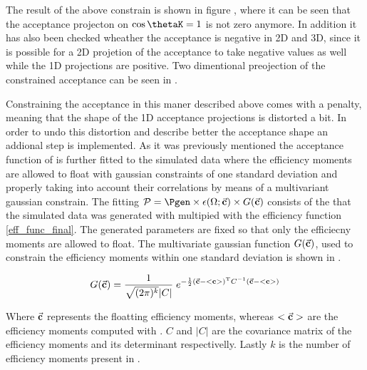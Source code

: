 \noindent The result of the above constrain is shown in figure , where it can be seen that the acceptance projecton on $\cos\thetaK=1$
is not zero anymore. In addition it has also been checked wheather the acceptance is negative in 2D and 3D, since it is possible for a 2D
projetion of the acceptance to take negative values as well while the 1D projections are positive. Two dimentional preojection of the constrained acceptance can be seen in .

Constraining the acceptance in this maner described above comes with a penalty, meaning that the shape of the 1D acceptance
projections is distorted a bit. In order to undo this distortion and describe better the acceptance shape an addional step is implemented. 
As it was previously mentioned the acceptance function of  is further fitted to the simulated data where the efficiency
moments are allowed to float with gaussian constraints of one standard deviation and properly taking into account their correlations by
means of a multivariant gaussian constrain. The fitting \pdf $\mathcal{P}= \Pgen \times\epsilon(\Omega;\vec{\bf c}) \times G(\vec{\bf{c}})$ 
consists of the \pdf that the simulated data was generated with multipied with the efficiency function \eqref{eff_func_final}. 
The generated parameters are fixed so that only the efficiecny moments are allowed to float.     
The multivariate gaussian function $G(\vec{\bf{c}})$, used to constrain the efficiency moments within one standard deviation is shown in .

\begin{center}
\begin{equation}
  G(\vec{\bf{c}}) = \frac{1}{\sqrt{(2\pi)^k}|C|} \; e^{-\frac{1}{2}(  \vec{\bf{c}} - <{\bf{c}}>  )^{\text{T}} C^{-1} (\vec{\bf{c}} - <{\bf{c}}> ) }
  \label{mvm_constr}
\end{equation}
\end{center}

\noindent Where $\vec{\bf c}$ represents the floatting efficiency moments, whereas $<\vec{\bf c}>$ are the efficiency moments computed
with . $C$ and $|C|$ are the covariance matrix of the efficiency moments and its determinant respectivelly.
Lastly $k$ is the number of efficiency moments present in . 

